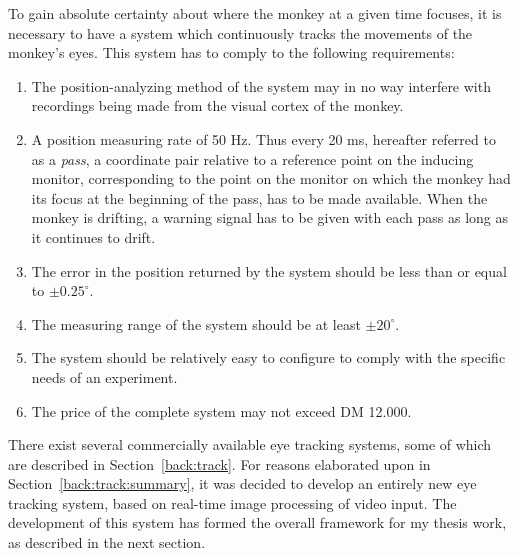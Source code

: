 To gain absolute certainty about where the monkey at a given time
focuses, it is necessary to have a system which continuously tracks
the movements of the monkey's eyes.  This system has to comply to the
following requirements:
\begin{enumerate}
\item The position-analyzing method of the system may in no way
  interfere with recordings being made from the visual cortex of the
  monkey.
\item\label{req:first}A position measuring rate of 50 Hz.  Thus every
  20 ms, hereafter referred to as a {\em pass\/}, a coordinate pair
  relative to a reference point on the inducing monitor, corresponding
  to the point on the monitor on which the monkey had its focus at the
  beginning of the pass, has to be made available.  When the monkey is
  drifting, a warning signal has to be given with each pass as long as
  it continues to drift.
\item\label{req:2}The error in the position returned by the system
  should be less than or equal to $\pm 0.25^{\circ}$.
\item\label{req:3}The measuring range of the system should be at least
  $\pm 20^{\circ}$.
\item\label{req:4}The system should be relatively easy to configure to
  comply with the specific needs of an experiment.
\item\label{req:last}The price of the complete system may not exceed
  DM 12.000.
\end{enumerate}

There exist several commercially available eye tracking systems, some
of which are described in Section~\ref{back:track}.  For reasons
elaborated upon in Section~\ref{back:track:summary}, it was decided to
develop an entirely new eye tracking system, based on real-time image
processing of video input.  The development of this system has formed
the overall framework for my thesis work, as described in the next
section.

